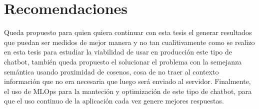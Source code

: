 \chapter{Recomendaciones}

\par Queda propuesto para quien quiera continuar con esta tesis el generar resultados
que puedan ser medidos de mejor manera y no tan cualitivamente como se realizo en esta tesis para
estudiar la viabilidad de 
usar en producción este tipo de chatbot, también queda propuesto el solucionar el problema 
con la semejanza semántica usando proximidad de cosenos, cosa de no traer al contexto información que no 
era necesaria que luego será enviado al servidor. Finalmente, el uso de MLOps para la manteción y optimización de este tipo de chatbot, para 
que el uso continuo de la aplicación cada vez genere mejores respuestas.